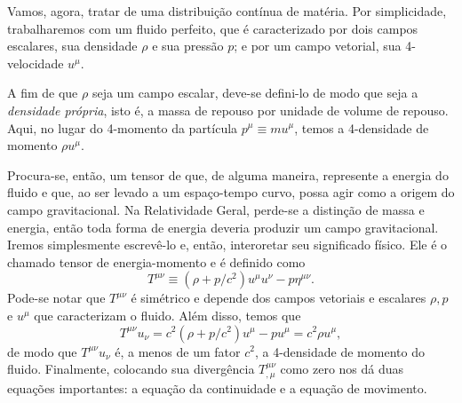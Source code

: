 Vamos, agora, tratar de uma distribuição contínua de matéria. Por simplicidade, trabalharemos com um fluido perfeito, que é caracterizado por dois campos escalares, sua densidade $\rho$ e sua pressão $p$; e por um campo vetorial, sua 4-velocidade $u^{\mu}$. 

A fim de que $\rho$ seja um campo escalar, deve-se defini-lo de modo que seja a \textit{densidade própria}, isto é, a massa de repouso por unidade de volume de repouso. Aqui, no lugar do 4-momento da partícula $p^\mu\equiv mu^\mu$, temos a 4-densidade de momento $\rho u^\mu$.

Procura-se, então, um tensor de que, de alguma maneira, represente a energia do fluido e que, ao ser levado a um espaço-tempo curvo, possa agir como a origem do campo gravitacional. Na Relatividade Geral, perde-se a distinção de massa e energia, então toda forma de energia deveria produzir um campo gravitacional. Iremos simplesmente escrevê-lo e, então, interoretar seu significado físico. Ele é o chamado tensor de energia-momento e é definido como
\begin{equation}\label{eq:TensorEnergiaMomentoDefinicao}
	T^{\mu \nu} \equiv\left(\rho+p / c^{2}\right) u^{\mu} u^{\nu}-p \eta^{\mu \nu}.
\end{equation}
Pode-se notar que $T^{\mu \nu}$ é simétrico e depende dos campos vetoriais e escalares $\rho, p$ e $u^\mu$ que caracterizam o fluido. Além disso, temos que
\[
	T^{\mu \nu} u_{\nu}=c^{2}\left(\rho+p / c^{2}\right) u^{\mu}-p u^{\mu}=c^{2} \rho u^{\mu},	
\]
de modo que $T^{\mu \nu}{u_{\nu}}$ é, a menos de um fator $c^2$, a 4-densidade de momento do fluido. Finalmente, colocando sua divergência $T^{\mu\nu}_{,\mu}$ como zero nos dá duas equações importantes: a equação da continuidade e a equação de movimento. 

